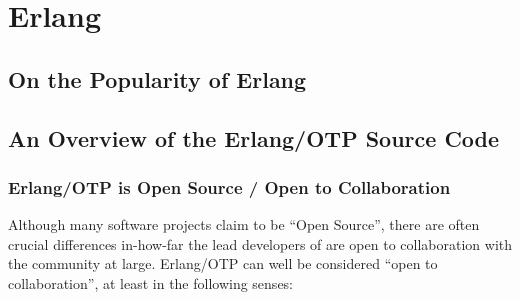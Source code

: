 \chapter{Erlang}
\label{app:erlang}

\section{On the Popularity of Erlang}
\label{app:popularity-of-erlang}

\section{An Overview of the Erlang/OTP Source Code}
\label{app:overview-of-erlang-source}

\subsection{Erlang/OTP is Open Source / Open to Collaboration}

Although many software projects claim to be ``Open Source'', there are
often crucial differences in-how-far the lead developers of are open
to collaboration with the community at large. Erlang/OTP can well be
considered ``open to collaboration'', at least in the following
senses:

